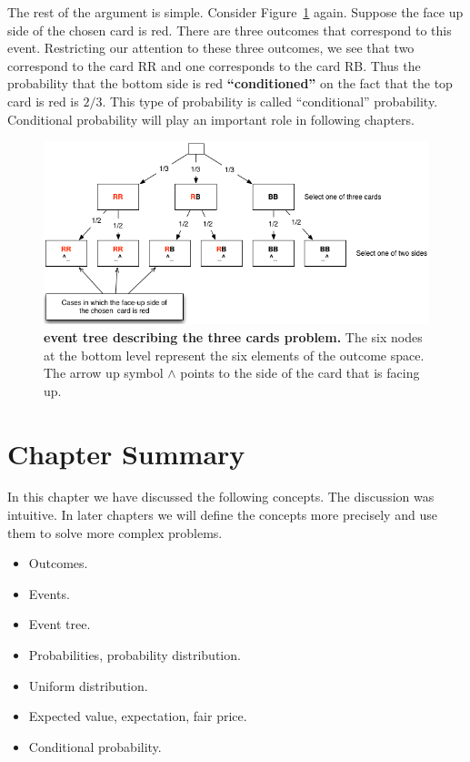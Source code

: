 The rest of the argument is simple. Consider Figure~\ref{fig:3cards}
again. Suppose the face up side of the chosen card is red. There are
three outcomes that correspond to this event. Restricting our
attention to these three outcomes, we see that two correspond to the
card RR and one corresponds to the card RB. Thus the probability that
the bottom side is red {\bf ``conditioned''} on the fact that the
top card is red is $2/3$. This type of probability is called
``conditional'' probability. Conditional probability will play an
important role in following chapters.

\begin{figure}[t]
\begin{center}
\includegraphics[width=4.5in]{figs/EventTree3Cards.png}
\end{center}
\caption{{\bf event tree describing the three cards problem.} The six
  nodes at the bottom level represent the six elements of the outcome
  space. The arrow up symbol $\wedge$ points to the side of the card
  that is facing up.\label{fig:3cards}}
\end{figure}

\section{Chapter Summary}
In this chapter we have discussed the following concepts. The
discussion was intuitive. In later chapters we will define the concepts
more precisely and use them to solve more complex problems.
\begin{itemize}
\item Outcomes.
\item Events.
\item Event tree.
\item Probabilities, probability distribution.
\item Uniform distribution.
\item Expected value, expectation, fair price.
\item Conditional probability.
\end{itemize}
